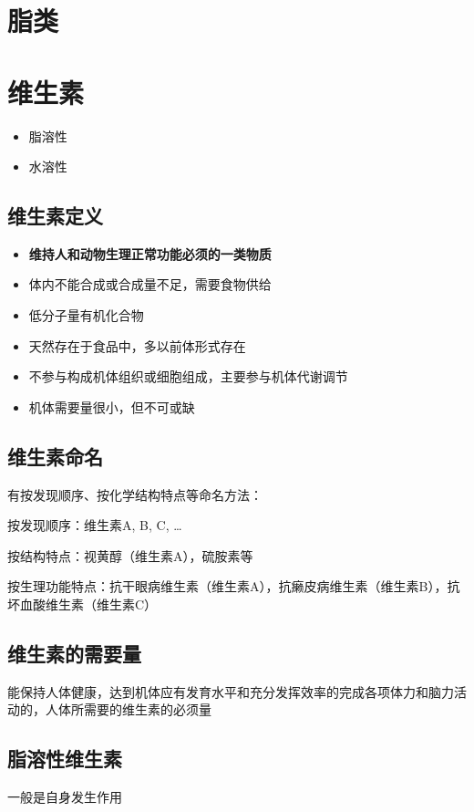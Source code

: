 \section{脂类}%
\label{sec:脂类}
\section{维生素}%
\label{sec:维生素}
\begin{itemize}
    \item 脂溶性
    \item 水溶性
\end{itemize}
\subsection{维生素定义}%
\label{sub:维生素定义}
\begin{itemize}
    \item \textbf{维持人和动物生理正常功能必须的一类物质}
    \item 体内不能合成或合成量不足，需要食物供给
    \item 低分子量有机化合物
    \item 天然存在于食品中，多以前体形式存在
    \item 不参与构成机体组织或细胞组成，主要参与机体代谢调节
    \item 机体需要量很小，但不可或缺
\end{itemize}
\subsection{维生素命名}%
\label{sub:维生素命名}
有按发现顺序、按化学结构特点等命名方法：
\begin{notation}
    按发现顺序：维生素A, B, C, \ldots 

    按结构特点：视黄醇（维生素A），硫胺素等

    按生理功能特点：抗干眼病维生素（维生素A），抗癞皮病维生素（维生素B），抗坏血酸维生素（维生素C）
\end{notation}
\subsection{维生素的需要量}%
\label{sub:维生素的需要量}
\begin{defi}
    能保持人体健康，达到机体应有发育水平和充分发挥效率的完成各项体力和脑力活动的，人体所需要的维生素的必须量
\end{defi}
\subsection{脂溶性维生素}%
\label{sub:脂溶性维生素}
一般是自身发生作用
